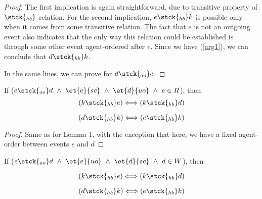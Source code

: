 \begin{proof}
        
        The first implication is again straightforward, due to transitive property of $\stck{_{hb}}$ relation. For the second implication, $e \stck{_{hb}} k$ is possible only when it comes from some transitive relation. The fact that $e$ is not an outgoing event also indicates that the only way this relation could be established is through some other event agent-ordered after $e$. Since we have (\ref{arg1}), we can conclude that $d \stck{_{hb}} k$.  
        
        In the same lines, we can prove for $d \stck{_{ao}} e$.
    \end{proof}
    
    \begin{lemma}
    
        If ($e \stck{_{ao}} d \ \wedge \ \et{e}{sc} \ \wedge \ \et{d}{uo} \ \wedge \  e \in R $), then
                \[
                    (k \stck{_{hb}} e) 
                    \Longleftrightarrow
                    (k \stck{_{hb}} d) 
                \]
                
                \[
                    (d \stck{_{hb}} k) 
                    \Longleftrightarrow
                    (e \stck{_{hb}} k) 
                \]
    
    \end{lemma}
    
    \begin{proof}
    
        Same as for Lemma 1, with the exception that here, we have a fixed agent-order between events $e$ and $d$
    \end{proof}
    
    \begin{lemma}
            
            If ($e \stck{_{ao}} d \ \wedge \ \et{e}{uo} \ \wedge \ 
                \et{d}{sc} \ \wedge \  
                d \in W $), then
                
                \[
                    (k \stck{_{hb}} e) 
                    \Longleftrightarrow
                    (k \stck{_{hb}} d) 
                \]
                
                \[
                    (d \stck{_{hb}} k) 
                    \Longleftrightarrow
                    (e \stck{_{hb}} k) 
                \]
    \end{lemma}
    
